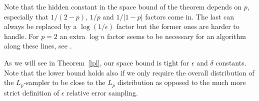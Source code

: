 Note that the hidden constant in the space bound of the theorem depends on
$p$, especially that $1/(2-p)$, $1/p$ and $1/|1-p|$ factors come in. The last
can
always be replaced by a $\log(1/\epsilon)$ factor but the former ones are
harder to handle. For $p=2$ an extra $\log n$ factor seems to be necessary for
an algorithm along these lines, see \cite{AndoniKO10}.

As we will see in Theorem~\ref{lpl}, our space bound is tight for $\epsilon$
and $\delta$ constants. Note that the lower bound holds also if we only
require the overall distribution of the $L_p$-sampler to be close to the $L_p$
distribution as opposed to the much more strict definition of $\epsilon$
relative error sampling.

